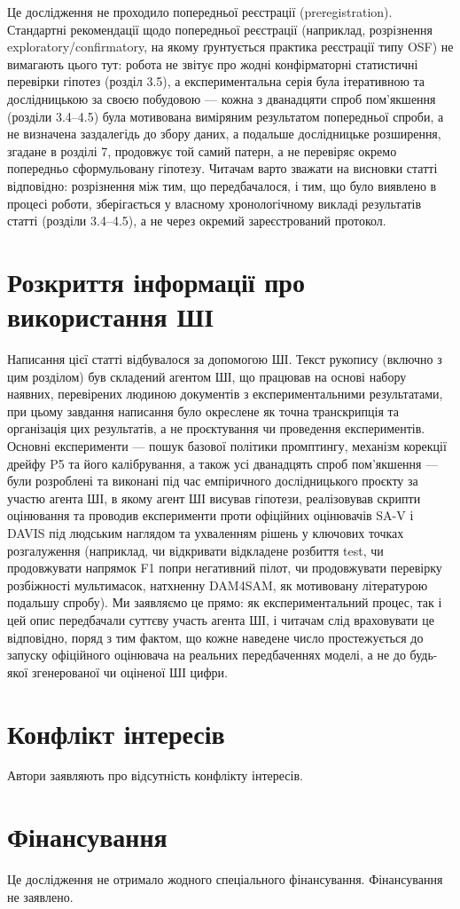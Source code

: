 \documentclass[11pt]{article}
\begin{document}
Це дослідження не проходило попередньої реєстрації (preregistration). Стандартні рекомендації щодо попередньої реєстрації (наприклад, розрізнення exploratory/confirmatory, на якому ґрунтується практика реєстрації типу OSF) не вимагають цього тут: робота не звітує про жодні конфірматорні статистичні перевірки гіпотез (розділ 3.5), а експериментальна серія була ітеративною та дослідницькою за своєю побудовою --- кожна з дванадцяти спроб пом'якшення (розділи 3.4--4.5) була мотивована виміряним результатом попередньої спроби, а не визначена заздалегідь до збору даних, а подальше дослідницьке розширення, згадане в розділі 7, продовжує той самий патерн, а не перевіряє окремо попередньо сформульовану гіпотезу. Читачам варто зважати на висновки статті відповідно: розрізнення між тим, що передбачалося, і тим, що було виявлено в процесі роботи, зберігається у власному хронологічному викладі результатів статті (розділи 3.4--4.5), а не через окремий зареєстрований протокол.

\section*{Розкриття інформації про використання ШІ}

Написання цієї статті відбувалося за допомогою ШІ. Текст рукопису (включно з цим розділом) був складений агентом ШІ, що працював на основі набору наявних, перевірених людиною документів з експериментальними результатами, при цьому завдання написання було окреслене як точна транскрипція та організація цих результатів, а не проєктування чи проведення експериментів. Основні експерименти --- пошук базової політики промптингу, механізм корекції дрейфу P5 та його калібрування, а також усі дванадцять спроб пом'якшення --- були розроблені та виконані під час емпіричного дослідницького проєкту за участю агента ШІ, в якому агент ШІ висував гіпотези, реалізовував скрипти оцінювання та проводив експерименти проти офіційних оцінювачів SA-V і DAVIS під людським наглядом та ухваленням рішень у ключових точках розгалуження (наприклад, чи відкривати відкладене розбиття test, чи продовжувати напрямок F1 попри негативний пілот, чи продовжувати перевірку розбіжності мультимасок, натхненну DAM4SAM, як мотивовану літературою подальшу спробу). Ми заявляємо це прямо: як експериментальний процес, так і цей опис передбачали суттєву участь агента ШІ, і читачам слід враховувати це відповідно, поряд з тим фактом, що кожне наведене число простежується до запуску офіційного оцінювача на реальних передбаченнях моделі, а не до будь-якої згенерованої чи оціненої ШІ цифри.

\section*{Конфлікт інтересів}

Автори заявляють про відсутність конфлікту інтересів.

\section*{Фінансування}

Це дослідження не отримало жодного спеціального фінансування. Фінансування не заявлено.



\end{document}
